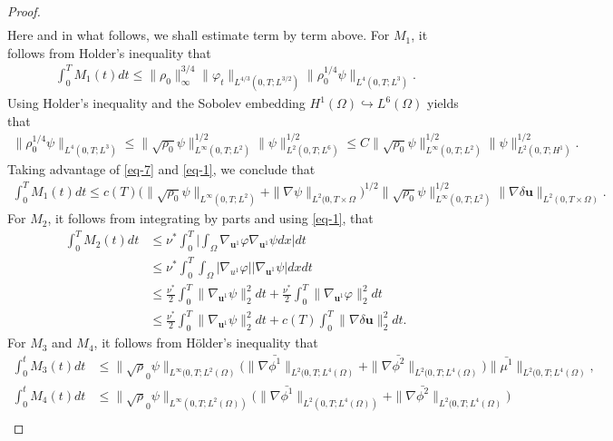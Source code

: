 \documentclass[11pt]{article}
\numberwithin{equation}{section}
\begin{document}
\begin{proof}
\begin{equation}
\begin{split}
\end{split}
\end{equation}
Here and in what follows, we shall estimate term by term above. For \( M_1 \), it follows from Holder's inequality that
\begin{align*}
\int_0^T M_1(t)dt \leq \| \rho_0 \|_\infty^{3/4} \| \varphi_t \|_{L^{4/3}(0,T; L^{3/2})} \| \rho_0^{1/4} \psi \|_{L^4(0,T; L^3)}.
\end{align*}
Using Holder's inequality and the Sobolev embedding \( H^1(\Omega) \hookrightarrow L^6(\Omega) \) yields that
\begin{align*}
\| \rho_0^{1/4} \psi \|_{L^4(0,T; L^3)} \leq \| \sqrt{\rho_0} \psi \|_{L^\infty(0,T; L^2)}^{1/2} \| \psi \|_{L^2(0,T; L^6)}^{1/2} \leq C \| \sqrt{\rho_0} \psi \|_{L^\infty(0,T; L^2)}^{1/2} \| \psi \|_{L^2(0,T; H^1)}^{1/2}.
\end{align*}
Taking advantage of \eqref{eq-7} and \eqref{eq-1}, we conclude that
\begin{align*}
\int_0^T M_1(t)dt \leq c(T) \big( \| \sqrt{\rho_0} \psi \|_{L^\infty(0,T; L^2)} + \| \nabla \psi \|_{L^2(0,T \times \Omega} \big)^{1/2} \| \sqrt{\rho_0} \psi \|_{L^\infty(0,T; L^2)}^{1/2} \| \nabla \delta \mathbf{u} \|_{L^2(0,T \times \Omega)}.
\end{align*}
For \( M_2 \), it follows from integrating by parts and using \eqref{eq-1}, that
\begin{align*}
\int_0^T M_2(t)dt &\leq \nu^* \int_0^T \big| \int_{\Omega} \nabla_{\mathbf{u}^1} \varphi \nabla_{\mathbf{u}^1} \psi dx \big| dt \\
&\leq \nu^* \int_0^T \int_{\Omega} |\nabla_{u^1} \varphi| |\nabla_{\mathbf{u}^1} \psi| dxdt \\
&\leq \frac{\nu^*}{2} \int_0^T \|\nabla_{\mathbf{u}^1}\psi\|_2^2 dt + \frac{\nu^*}{2} \int_0^T \|\nabla_{\mathbf{u}^1} \varphi\|_2^2 dt \\
&\leq \frac{\nu^*}{2} \int_0^T \|\nabla_{\mathbf{u}^1} \psi\|_2^2 dt + c(T) \int_0^T \|\nabla \delta \mathbf{u}\|_2^2 dt.
\end{align*}
For \( M_3 \) and \( M_4 \),  it follows from H\"{o}lder's inequality that
\begin{align*}
\int_{0}^{t} M_{3}(t) dt &\leq \|\sqrt\rho_0 \psi\|_{L^{\infty}(0,T; L^2(\Omega)} \big( \|\nabla \bar{\phi^1}\|_{L^2(0,T; L^4(\Omega)} + \|\nabla \bar{\phi^2}\|_{L^2(0,T; L^4(\Omega)} \big) \|\bar{\mu^1}\|_{L^2(0,T; L^4(\Omega)}, \\
\int_{0}^{t} M_{4}(t) dt &\leq \|\sqrt\rho_0 \psi\|_{L^{\infty}(0,T; L^2(\Omega))} \big( \|\nabla \bar{\phi^1}\|_{L^2(0,T; L^4(\Omega))} + \|\nabla \bar{\phi^2}\|_{L^2(0,T; L^4(\Omega)} \big)\\

\end{align*}
\end{proof}
\end{document}
